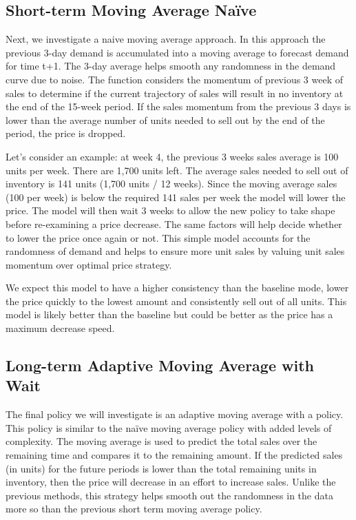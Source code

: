 \documentclass[11pt,a4paper]{article}
\begin{document}
\subsection{Short-term Moving Average Naïve}
Next, we investigate a naive moving average approach. 
In this approach the previous 3-day demand is accumulated into a moving average to forecast demand for time t+1. 
The 3-day average helps smooth any randomness in the demand curve due to noise. 
The function considers the momentum of previous 3 week of sales to determine if the current trajectory of sales will result in no inventory at the end of the 15-week period. 
If the sales momentum from the previous 3 days is lower than the average number of units needed to sell out by the end of the period, the price is dropped. 

Let’s consider an example: at week 4, the previous 3 weeks sales average is 100 units per week. There are 1,700 units left. 
The average sales needed to sell out of inventory is 141 units (1,700 units / 12 weeks). 
Since the moving average sales (100 per week) is below the required 141 sales per week the model will lower the price. 
The model will then wait 3 weeks to allow the new policy to take shape before re-examining a price decrease. 
The same factors will help decide whether to lower the price once again or not. 
This simple model accounts for the randomness of demand and helps to ensure more unit sales by valuing unit sales momentum over optimal price strategy.

We expect this model to have a higher consistency than the baseline mode, lower the price quickly to the lowest amount and consistently sell out of all units.  
This model is likely better than the baseline but could be better as the price has a maximum decrease speed.

\subsection{Long-term Adaptive Moving Average with Wait}
The final policy we will investigate is an adaptive moving average with a policy. 
This policy is similar to the naïve moving average policy with added levels of complexity. 
The moving average is used to predict the total sales over the remaining time and compares it to the remaining amount. 
If the predicted sales (in units) for the future periods is lower than the total remaining units in inventory, then the price will decrease in an effort to increase sales. 
Unlike the previous methods, this strategy helps smooth out the randomness in the data more so than the previous short term moving average policy. 
\end{document}
